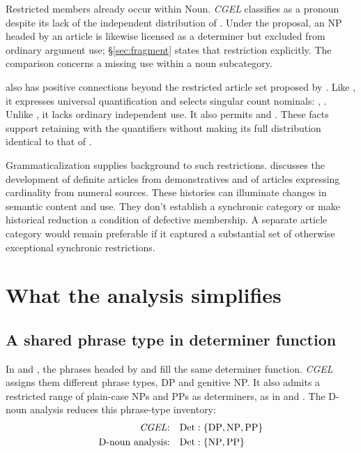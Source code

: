 \documentclass[12pt]{article}
\begin{document}
Restricted members already occur within Noun. \textit{CGEL} classifies  as a pronoun despite its lack of the independent distribution of  \citep[470--471]{huddleston2002}. Under the proposal, an NP headed by an article is likewise licensed as a determiner but excluded from ordinary argument use; §\ref{sec:fragment} states that restriction explicitly. The comparison concerns a missing use within a noun subcategory.

 also has positive connections beyond the restricted article set proposed by \textcite{spinillo2004reconceptualising}. Like , it expresses universal quantification and selects singular count nominals: , . Unlike , it lacks ordinary independent use. It also permits  and . These facts support retaining  with the quantifiers without making its full distribution identical to that of .

Grammaticalization supplies background to such restrictions. \textcite[331--336]{lyons1999} discusses the development of definite articles from demonstratives and of articles expressing cardinality from numeral sources. These histories can illuminate changes in semantic content and use. They don't establish a synchronic category or make historical reduction a condition of defective membership. A separate article category would remain preferable if it captured a substantial set of otherwise exceptional synchronic restrictions.

\section{What the analysis simplifies}\label{sec:economy}

\subsection{A shared phrase type in determiner function}\label{sec:det-uniform}

In  and , the phrases headed by  and  fill the same determiner function. \textit{CGEL} assigns them different phrase types, DP and genitive NP. It also admits a restricted range of plain-case NPs and PPs as determiners, as in  and  \citep[Ch.~5, §4]{huddleston2002}. The D-noun analysis reduces this phrase-type inventory:
\[
\begin{aligned}
\text{\textit{CGEL}:} &\quad \mathrm{Det}:\{\mathrm{DP},\mathrm{NP},\mathrm{PP}\} \\
\text{D-noun analysis:} &\quad \mathrm{Det}:\{\mathrm{NP},\mathrm{PP}\}
\end{aligned}
\]
\end{document}
